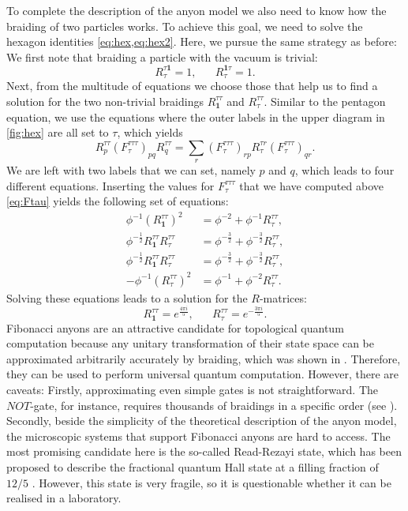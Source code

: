 \begin{exmp}
	To complete the description of the anyon model we also need to know how the braiding of two particles works. To achieve this goal, we need to solve the hexagon identities \cref{eq:hex,eq:hex2}. Here, we pursue the same strategy as before: We first note that braiding a particle with the vacuum is trivial:
		\begin{equation}
			R_\tau^{\tau\mathbf{1}}=1,\hspace{20pt}R_\tau^{\mathbf{1}\tau}=1.
		\end{equation}
	Next, from the multitude of equations we choose those that help us to find a solution for the two non-trivial braidings $R_\mathbf{\mathbf{1}}^{\tau\tau}$ and $R_\tau^{\tau\tau}$. Similar to the pentagon equation, we use the equations where the outer labels in the upper diagram in \cref{fig:hex} are all set to $\tau$, which yields
		\begin{equation}
			R_p^{\tau\tau}\left(F_\tau^{\tau\tau\tau}\right)_{pq}R_q^{\tau\tau}=\sum_r\left(F_\tau^{\tau\tau\tau}\right)_{rp}R_{\tau}^{\tau r}\left(F_\tau^{\tau\tau\tau}\right)_{qr}.
		\end{equation}
	We are left with two labels that we can set, namely $p$ and $q$, which leads to four different equations. Inserting the values for $F_\tau^{\tau\tau\tau}$ that we have computed above \cref{eq:Ftau} yields the following set of equations:
		\begin{align}
			\phi^{-1} \left(R_\mathbf{1}^{\tau\tau}\right)^2&=\phi^{-2}+\phi^{-1}R_\tau^{\tau\tau},\\
			\phi^{-\frac{1}{2}}R_\mathbf{1}^{\tau\tau}R_\tau^{\tau\tau}&=\phi^{-\frac{3}{2}}+\phi^{-\frac{3}{2}}R_\tau^{\tau\tau},\\
			\phi^{-\frac{1}{2}}R_\mathbf{1}^{\tau\tau}R_\tau^{\tau\tau}&=\phi^{-\frac{3}{2}}+\phi^{-\frac{3}{2}}R_\tau^{\tau\tau},\\
			-\phi^{-1}\left(R_\tau^{\tau\tau}\right)^2&=\phi^{-1}+\phi^{-2}R_\tau^{\tau\tau}.
		\end{align}
	Solving these equations leads to a solution for the $R$-matrices:
		\begin{equation}
			R_\mathbf{1}^{\tau\tau}=e^{\frac{4\pi i}{5}},\hspace{20pt}R_\tau^{\tau\tau}=e^{-\frac{3\pi i}{5}}.
		\end{equation}
	Fibonacci anyons are an attractive candidate for topological quantum computation because any unitary transformation of their state space can be approximated arbitrarily accurately by braiding, which was shown in \cite{Bonesteel2005,Hormozi2007}. Therefore, they can be used to perform universal quantum computation. However, there are caveats: Firstly, approximating even simple gates is not straightforward. The $NOT$-gate, for instance, requires thousands of braidings in a specific order (see \cite{Bonesteel2005,Baraban2010}). Secondly, beside the simplicity of the theoretical description of the anyon model, the microscopic systems that support Fibonacci anyons are hard to access. The most promising candidate here is the so-called Read-Rezayi state, which has been proposed to describe the fractional quantum Hall state at a filling fraction of $12/5$ \cite{Read1999}. However, this state is very fragile, so it is questionable whether it can be realised in a laboratory.

\end{exmp}

